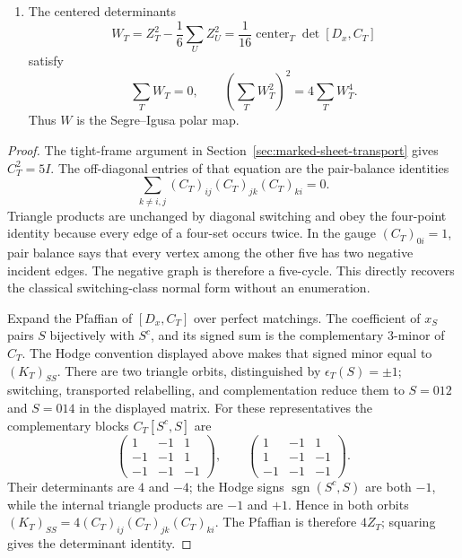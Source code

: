 \begin{theorem}
\begin{enumerate}
\[\]
They are the signed Joubert coordinates and hence define the classical map
from six labelled points to the Segre cubic
\[
 \left\{[z]\in\mathbf P^5:\sum_Tz_T=\sum_Tz_T^3=0\right\}.
\]
Inside its hyperplane \(z_T=0\), the remaining linear relation cuts the
ambient space to \(\mathbf P^3\), and the remaining cubic equation is the
diagonal Clebsch cubic surface.
\item The centered determinants
\[
 W_T=Z_T^2-\frac16\sum_UZ_U^2
     =\frac1{16}\operatorname{center}_T\det[D_x,C_T]
\]
satisfy
\[
 \sum_TW_T=0,
 \qquad
 \left(\sum_TW_T^2\right)^2=4\sum_TW_T^4.
\]
Thus \(W\) is the Segre--Igusa polar map.
\end{enumerate}
\end{theorem}

\begin{proof}
The tight-frame argument in Section~\ref{sec:marked-sheet-transport} gives
\(C_T^2=5I\).  The off-diagonal entries of that equation are the pair-balance
identities
\[
 \sum_{k\ne i,j}(C_T)_{ij}(C_T)_{jk}(C_T)_{ki}=0.
\]
Triangle products are unchanged by diagonal switching and obey the
four-point identity because every edge of a four-set occurs twice.  In the
gauge \((C_T)_{0i}=1\), pair balance says that every vertex among the other
five has two negative incident edges.  The negative graph is therefore a
five-cycle.  This directly recovers the classical switching-class normal
form without an enumeration.

Expand the Pfaffian of \([D_x,C_T]\) over perfect matchings.  The coefficient
of \(x_S\) pairs \(S\) bijectively with \(S^c\), and its signed sum is the
complementary \(3\)-minor of \(C_T\).  The Hodge convention displayed above
makes that signed minor equal to \((K_T)_{SS}\).  There are two triangle
orbits, distinguished by \(\epsilon_T(S)=\pm1\); switching, transported
relabelling, and complementation reduce them to \(S=012\) and \(S=014\) in
the displayed matrix.  For these representatives the complementary blocks
\(C_T[S^c,S]\) are
\[
 \begin{pmatrix}1&-1&1\\-1&-1&1\\-1&-1&-1\end{pmatrix},
 \qquad
 \begin{pmatrix}1&-1&1\\1&-1&-1\\-1&-1&-1\end{pmatrix}.
\]
Their determinants are \(4\) and \(-4\); the Hodge signs
\(\operatorname{sgn}(S^c,S)\) are both \(-1\), while the internal triangle
products are \(-1\) and \(+1\).  Hence in both orbits
\((K_T)_{SS}=4(C_T)_{ij}(C_T)_{jk}(C_T)_{ki}\).  The Pfaffian is
therefore \(4Z_T\); squaring gives the determinant identity.


\end{proof}
